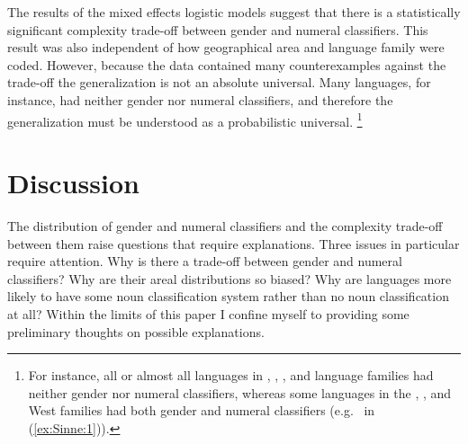 \documentclass[output=collectionpaper]{langsci/langscibook}
\begin{document}
The results of the mixed effects logistic models suggest that there is a statistically significant complexity trade-off between gender and numeral classifiers. This result was also independent of how geographical area and language family were coded. However, because the data contained many counterexamples against the trade-off the generalization is not an absolute universal. Many languages, for instance, had neither gender nor numeral classifiers, and therefore the generalization must be understood as a probabilistic universal.%
\footnote{For instance, all or almost all languages in , , , and  language families had neither gender nor numeral classifiers, whereas some languages in the , , and West  families had both gender and numeral classifiers (e.g.\  in (\ref{ex:Sinne:1})).}


\section{Discussion}
\label{sec:Sinne:5}

The distribution of gender and numeral classifiers and the complexity trade-off between them raise questions that require explanations. Three issues in particular require attention. Why is there a trade-off between gender and numeral classifiers? Why are their areal distributions so biased? Why are languages more likely to have some noun classification system rather than no noun classification at all? Within the limits of this paper I confine myself to providing some preliminary thoughts on possible explanations.
\end{document}
